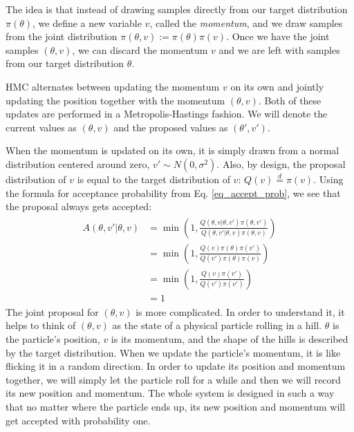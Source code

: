 \documentclass[12pt]{article}
\begin{document}
The idea is that instead of drawing samples directly from our target distribution $\pi(\theta)$, we define a new variable $v$, called the \textit{momentum}, and we draw samples from the joint distribution $\pi(\theta, v) := \pi(\theta)\pi(v)$. Once we have the joint samples $(\theta, v)$, we can discard the momentum $v$ and we are left with samples from our target distribution $\theta$.

HMC alternates between updating the momentum $v$ on its own and jointly updating the position together with the momentum $(\theta, v)$. Both of these updates are performed in a Metropolis-Hastings fashion. We will denote the current values as $(\theta, v)$ and the proposed values as $(\theta', v')$.

When the momentum is updated on its own, it is simply drawn from a normal distribution centered around zero, $v' \sim N(0, \sigma^2)$. Also, by design, the proposal distribution of $v$ is equal to the target distribution of $v$: $Q(v) \overset{d}{=} \pi(v)$. Using the formula for acceptance probability from Eq. \ref{eq_accept_prob}, we see that the proposal always gets accepted:
\begin{align}
\begin{split}
A(\theta,v'|\theta,v) &= \min \left(1, \frac{Q(\theta,v|\theta,v')\pi(\theta,v')}{Q(\theta,v'|\theta,v)\pi(\theta,v)} \right) \\
&= \min \left(1, \frac{Q(v)\pi(\theta)\pi(v')}{Q(v')\pi(\theta)\pi(v)} \right) \\
&= \min \left(1, \frac{Q(v)\pi(v')}{Q(v')\pi(v')} \right) \\
&= 1
\end{split}
\end{align}
The joint proposal for $(\theta, v)$ is more complicated. In order to understand it, it helps to think of $(\theta, v)$ as the state of a physical particle rolling in a hill. $\theta$ is the particle's position, $v$ is its momentum, and the shape of the hills is described by the target distribution. When we update the particle's momentum, it is like flicking it in a random direction. In order to update its position and momentum together, we will simply let the particle roll for a while and then we will record its new position and momentum. The whole system is designed in such a way that no matter where the particle ends up, its new position and momentum will get accepted with probability one.
\end{document}
